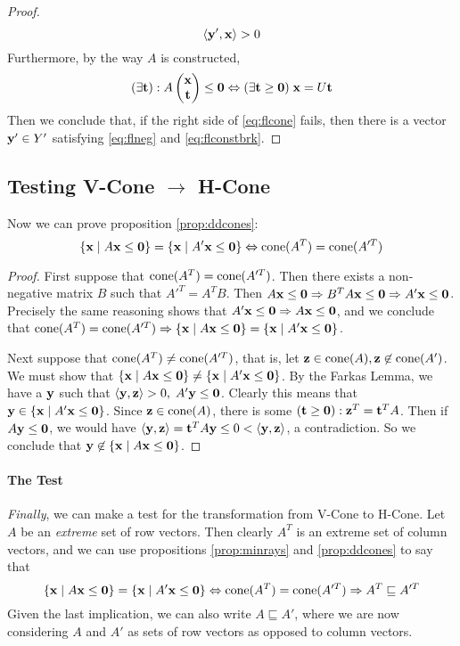 \begin{proof}
	\begin{equation}\label{eq:flconstbrk} \left\langle \mathbf{y}', \mathbf{x} \right\rangle > 0 \end{equation}
	Furthermore, by the way $A$ is constructed,
	\begin{equation}\label{eq:flcone}
		(\exists \t) : A \xt \leq \0 \Leftrightarrow (\exists \t\geq\0)\; \x = U\t
	\end{equation}
	Then we conclude that, if the right side of \eqref{eq:flcone} fails, then there is a vector $\mathbf{y}' \in Y'$ satisfying \eqref{eq:flneg} and \eqref{eq:flconstbrk}.
\end{proof}

\subsection{Testing V-Cone $\to$ H-Cone}

Now we can prove proposition \ref{prop:ddcones}:
\[ \left\{\mathbf{x}\;|\; A\mathbf{x}\leq\mathbf{0}\right\} = \left\{\mathbf{x}\;|\; A'\mathbf{x}\leq\mathbf{0}\right\} \Leftrightarrow \operatorname{cone}(A^T) = \operatorname{cone}(A'^T) \]
\begin{proof}
	First suppose that $\operatorname{cone}(A^T) = \operatorname{cone}(A'^T)$.  Then there exists a non-negative matrix $B$ such that $A'^T = A^TB$.  Then $A\mathbf{x} \leq \mathbf{0} \Rightarrow B^TA\mathbf{x}\leq \mathbf{0} \Rightarrow A'\mathbf{x}\leq\mathbf{0}$.  Precisely the same reasoning shows that $A'\mathbf{x}\leq\mathbf{0} \Rightarrow A\mathbf{x}\leq\mathbf{0}$, and we conclude that $\operatorname{cone}(A^T) = \operatorname{cone}(A'^T) \Rightarrow \left\{\mathbf{x}\;|\; A\mathbf{x}\leq\mathbf{0}\right\} = \left\{\mathbf{x}\;|\; A'\mathbf{x}\leq\mathbf{0}\right\}$.

	Next suppose that $\operatorname{cone}(A^T) \neq \operatorname{cone}(A'^T)$, that is, let $\mathbf{z} \in \operatorname{cone}(A), \mathbf{z} \not\in\operatorname{cone}(A')$.  We must show that $\left\{\mathbf{x}\;|\; A\mathbf{x}\leq\mathbf{0}\right\} \neq \left\{\mathbf{x}\;|\; A'\mathbf{x}\leq\mathbf{0}\right\}$.  By the Farkas Lemma, we have a $\mathbf{y}$ such that $\left\langle \mathbf{y}, \mathbf{z} \right\rangle > 0,\; A'\mathbf{y} \leq \mathbf{0}$.  Clearly this means that $\mathbf{y} \in \left\{\mathbf{x}\;|\; A'\mathbf{x}\leq\mathbf{0}\right\}$.  Since $\mathbf{z} \in \operatorname{cone}(A)$, there is some $(\mathbf{t} \geq \mathbf{0}): \mathbf{z}^T = \mathbf{t}^T A$.  Then if $A\mathbf{y}\leq\mathbf{0}$, we would have $\left\langle \mathbf{y}, \mathbf{z} \right\rangle = \mathbf{t}^T A\mathbf{y} \leq 0 < \left\langle \mathbf{y}, \mathbf{z} \right\rangle$, a contradiction.  So we conclude that $\mathbf{y}\not\in\left\{\mathbf{x}\;|\; A\mathbf{x}\leq\mathbf{0}\right\}$.
\end{proof}

\paragraph{The Test}
\textit{Finally}, we can make a test for the transformation from V-Cone to H-Cone.  Let $A$ be an \textit{extreme} set of row vectors.  Then clearly $A^T$ is an extreme set of column vectors, and we can use propositions \ref{prop:minrays} and \ref{prop:ddcones} to say that
\[ \left\{\mathbf{x}\;|\; A\mathbf{x}\leq\mathbf{0}\right\} = \left\{\mathbf{x}\;|\; A'\mathbf{x}\leq\mathbf{0}\right\} \Leftrightarrow \operatorname{cone}(A^T) = \operatorname{cone}(A'^T) \Rightarrow A^T \sqsubseteq A'^T \]
Given the last implication, we can also write $A \sqsubseteq A'$, where we are now considering $A$ and $A'$ as sets of row vectors as opposed to column vectors.

